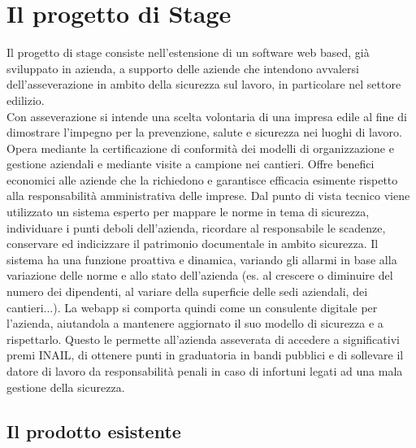 
\cleardoublepage
\section{Il progetto di Stage}
Il progetto di stage consiste nell'estensione di un software web based, già sviluppato in azienda, a supporto delle aziende che intendono avvalersi dell’asseverazione in ambito della sicurezza sul lavoro, in particolare nel settore edilizio. \\
Con asseverazione si intende una scelta volontaria di una impresa edile al fine di dimostrare l'impegno per la prevenzione, salute e sicurezza nei luoghi di lavoro. Opera mediante la certificazione di conformità dei modelli di organizzazione e gestione aziendali e mediante visite a campione nei cantieri. Offre benefici economici alle aziende che la richiedono e garantisce efficacia esimente rispetto alla responsabilità amministrativa delle imprese.
Dal punto di vista tecnico viene utilizzato un sistema esperto per mappare le norme in tema di sicurezza, individuare i punti deboli dell’azienda, ricordare al responsabile le scadenze, conservare ed indicizzare il patrimonio documentale in ambito sicurezza.
Il sistema ha una funzione proattiva e dinamica, variando gli allarmi in base alla variazione delle norme e allo stato dell’azienda (es. al crescere o diminuire del numero dei dipendenti, al variare della superficie delle sedi aziendali, dei cantieri...). La webapp si comporta quindi come un consulente digitale per l’azienda, aiutandola a mantenere aggiornato il suo modello di sicurezza e a rispettarlo.
Questo le permette all’azienda asseverata di accedere a significativi premi INAIL, di ottenere punti in graduatoria in bandi pubblici e di sollevare il datore di lavoro da responsabilità penali in caso di infortuni legati ad una mala gestione della sicurezza.

\subsection{Il prodotto esistente}

